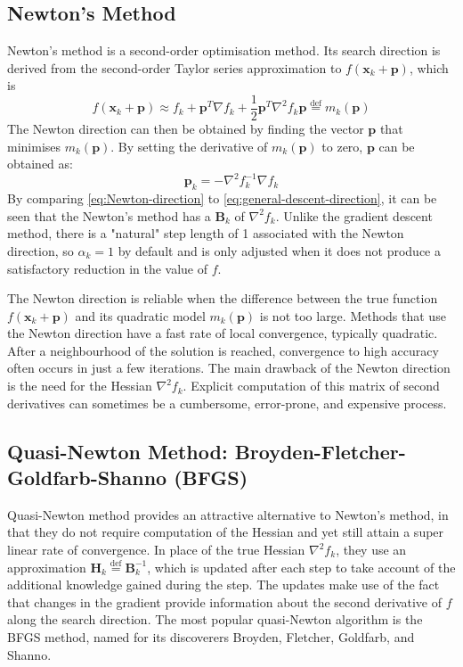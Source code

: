 \subsection{Newton's Method}
Newton's method is a second-order optimisation method. Its search direction is derived from the second-order Taylor series approximation to $f(\textbf{x}_k+\textbf{p})$, which is
\begin{equation}
  f(\textbf{x}_k+\textbf{p}) \approx f_k + \textbf{p}^T \nabla f_k + \frac{1}{2}\textbf{p}^T \nabla^2 f_k \textbf{p} \stackrel{\text{def}}{=}m_k(\textbf{p})
\end{equation}
The Newton direction can then be obtained by finding the vector $\textbf{p}$ that minimises $m_k(\textbf{p})$. By setting the derivative of $m_k(\textbf{p})$ to zero, $\textbf{p}$ can be obtained as:
\begin{equation}
  \textbf{p}_k=-\nabla^2 f_k^{-1}\nabla f_k \label{eq:Newton-direction}
\end{equation}
By comparing \cref{eq:Newton-direction} to \cref{eq:general-descent-direction}, it can be seen that the Newton's method has a $\textbf{B}_k$ of $\nabla^2 f_k$. Unlike the gradient descent method, there is a "natural" step length of 1 associated with the Newton direction, so $\alpha_k = 1$ by default and is only adjusted when it does not produce a satisfactory reduction in the value of $f$.

The Newton direction is reliable when the difference between the true function $f(\textbf{x}_k+\textbf{p})$ and its quadratic model $m_k(\textbf{p})$ is not too large. Methods that use the Newton direction have a fast rate of local convergence, typically quadratic. After a neighbourhood of the solution is reached, convergence to high accuracy often occurs in just a few iterations. The main drawback of the Newton direction is the need for the Hessian $\nabla^2 f_k$. Explicit computation of this matrix of second derivatives can sometimes be a cumbersome, error-prone, and expensive process. \cite{Nocedal2006}



\subsection{Quasi-Newton Method: Broyden-Fletcher-Goldfarb-Shanno (BFGS)}\label{sec:BFGS}
Quasi-Newton method provides an attractive alternative to Newton's method, in that they do not require computation of the Hessian and yet still attain a super linear rate of convergence. In place of the true Hessian $\nabla^2 f_k$, they use an approximation $\textbf{H}_k \stackrel{\text{def}}{=} \textbf{B}_k^{-1}$, which is updated after each step to take account of the additional knowledge gained during the step. The updates make use of the fact that changes in the gradient provide information about the second derivative of $f$ along the search direction. The most popular quasi-Newton algorithm is the BFGS method, named for its discoverers Broyden, Fletcher, Goldfarb, and Shanno. \cite{Nocedal2006}

